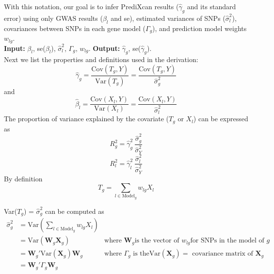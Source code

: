 \documentclass[10pt]{article}
\begin{document}
With this notation, our goal is to infer PrediXcan results ($\hat\gamma_g$ and its standard error) using only GWAS results ($\beta_l$ and se), estimated variances of SNPs 
($\hat\sigma^2_l$), covariances between SNPs in each gene model ($\Gamma_g$), and prediction model weights $w_{lg}$.\\

\textbf{Input:}  $\beta_l$, se($\beta_l$), $\hat\sigma^2_l$, $\Gamma_g$, $w_{lg}$.
\textbf{Output:} 
$\hat\gamma_g$, se($\hat\gamma_g$).\\

Next we list the properties and definitions used in the derivation: 
\begin{equation}
\hat\gamma_g = \frac{ \text{Cov}(T_g,Y) }{ \text{Var}(T_g)}  =  \frac{ \text{Cov}(T_g,Y) }{ \hat\sigma^2_g }
\end{equation}
and  
\begin{equation}
\hat \beta_l = \frac{ \text{Cov}(X_l,Y) }{ \text{Var}(X_l) } =  \frac{ \text{Cov}(X_l,Y) }{ \hat\sigma_l^2 } \label{eq.beta}
\end{equation}
The proportion of variance explained by the covariate ($T_g$ or $X_l$) can be expressed as\\
\begin{equation}
R_g^2 = \hat\gamma^2_g ~ \frac{\hat\sigma_g^2 }{ \hat\sigma^2_Y} \nonumber
\end{equation}
\begin{equation}
R_l^2 = \hat\gamma^2_l ~ \frac{\hat\sigma_l^2 }{ \hat\sigma^2_Y} \nonumber
\end{equation}
By definition
\begin{equation}
T_g = \sum_{l \in \text{Model}_g} w_{lg}X_l 
\end{equation}

Var($T_g$) = $\hat\sigma^2_g$ can be computed as
\begin{align}
\hat\sigma^2_g & = \text{Var} \left ( \sum_{l \in \text{Model}_g} w_{lg} X_l \right )\nonumber  & \text{}\\  
& = \text{Var} (\mathbf{W}_g \mathbf{X}_g) \nonumber  & \text{where } \mathbf{W}_g \text{is the vector of } w_{lg} \text{for SNPs in the model of } g \\
& = \mathbf{W}_g' \text{Var}( \mathbf{X}_g )\mathbf{W}_g \nonumber  & \text{where } \Gamma_g \text{ is the} \text{Var}( \mathbf{X}_g ) = \text{ covariance matrix of } \mathbf{X}_g \\
& = \mathbf{W}_g'  \Gamma_g \mathbf{W}_g & \text{} \label{eq.var.g}
\end{align}
\end{document}
